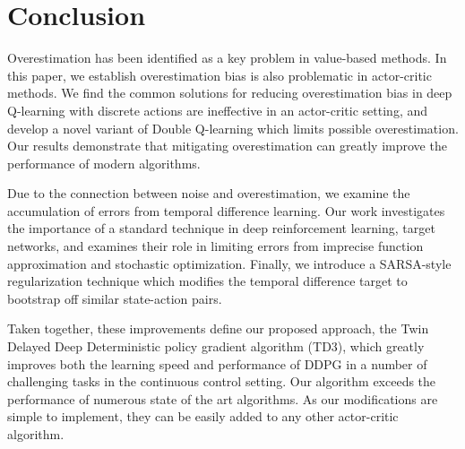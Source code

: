 \documentclass{article}
\begin{document}
\section{Conclusion}

Overestimation has been identified as a key problem in value-based methods. In this paper, we establish overestimation bias is also problematic in actor-critic methods. We find the common solutions for reducing overestimation bias in deep Q-learning with discrete actions are ineffective in an actor-critic setting, and develop a novel variant of Double Q-learning which limits possible overestimation. Our results demonstrate that mitigating overestimation can greatly improve the performance of modern algorithms. 

Due to the connection between noise and overestimation, we examine the accumulation of errors from temporal difference learning. Our work investigates the importance of a standard technique in deep reinforcement learning, target networks, and examines their role in limiting errors from imprecise function approximation and stochastic optimization. Finally, we introduce a SARSA-style regularization technique which modifies the temporal difference target to bootstrap off similar state-action pairs. 

Taken together, these improvements define our proposed approach, the Twin Delayed Deep Deterministic policy gradient algorithm (TD3), which greatly improves both the learning speed and performance of DDPG in a number of challenging tasks in the continuous control setting. Our algorithm exceeds the performance of numerous state of the art algorithms. As our modifications are simple to implement, they can be easily added to any other actor-critic algorithm. 




\clearpage
\onecolumn


\appendix

\end{document}
